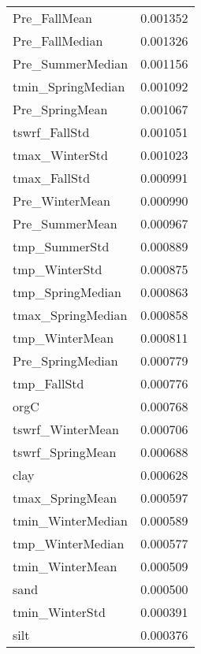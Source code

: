 \begin{tabular}{lr}
Pre_FallMean & 0.001352 \\
Pre_FallMedian & 0.001326 \\
Pre_SummerMedian & 0.001156 \\
tmin_SpringMedian & 0.001092 \\
Pre_SpringMean & 0.001067 \\
tswrf_FallStd & 0.001051 \\
tmax_WinterStd & 0.001023 \\
tmax_FallStd & 0.000991 \\
Pre_WinterMean & 0.000990 \\
Pre_SummerMean & 0.000967 \\
tmp_SummerStd & 0.000889 \\
tmp_WinterStd & 0.000875 \\
tmp_SpringMedian & 0.000863 \\
tmax_SpringMedian & 0.000858 \\
tmp_WinterMean & 0.000811 \\
Pre_SpringMedian & 0.000779 \\
tmp_FallStd & 0.000776 \\
orgC & 0.000768 \\
tswrf_WinterMean & 0.000706 \\
tswrf_SpringMean & 0.000688 \\
clay & 0.000628 \\
tmax_SpringMean & 0.000597 \\
tmin_WinterMedian & 0.000589 \\
tmp_WinterMedian & 0.000577 \\
tmin_WinterMean & 0.000509 \\
sand & 0.000500 \\
tmin_WinterStd & 0.000391 \\
silt & 0.000376 \\
\bottomrule
\end{tabular}
